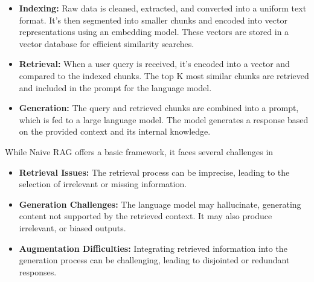 \begin{itemize}
	\item \textbf{Indexing:} Raw data is cleaned, extracted, and converted into a uniform text format. It's then segmented into smaller chunks and encoded into vector representations using an embedding model. These vectors are stored in a vector database for efficient similarity searches.
	\item \textbf{Retrieval:} When a user query is received, it's encoded into a vector and compared to the indexed chunks. The top K most similar chunks are retrieved and included in the prompt for the language model.
	\item \textbf{Generation:} The query and retrieved chunks are combined into a prompt, which is fed to a large language model. The model generates a response based on the provided context and its internal knowledge.
\end{itemize}
While Naive RAG offers a basic framework, it faces several challenges in 
\begin{itemize}
	\item\textbf{Retrieval Issues:} The retrieval process can be imprecise, leading to the selection of irrelevant or missing information.
	\item \textbf{Generation Challenges:} The language model may hallucinate, generating content not supported by the retrieved context. It may also produce irrelevant, or biased outputs.
	\item \textbf{Augmentation Difficulties:} Integrating retrieved information into the generation process can be challenging, leading to disjointed or redundant responses.
\end{itemize}

